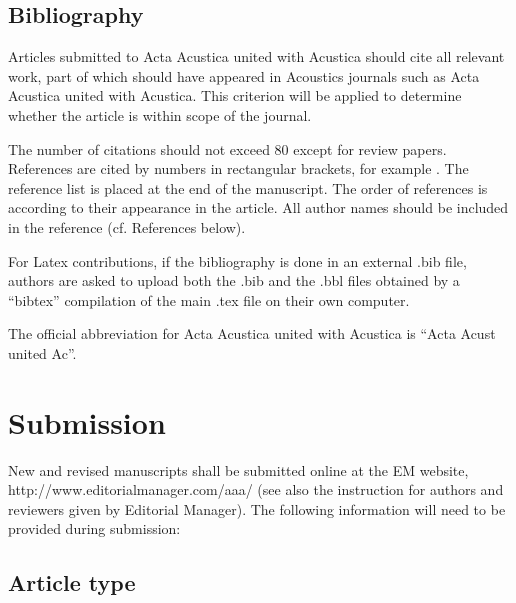 \documentclass[twocolumn]{article}
\begin{document}
\subsection{Bibliography}

Articles submitted to Acta Acustica united with Acustica should cite
all relevant work, part of which should have appeared in Acoustics
journals such as Acta Acustica united with Acustica. This criterion
will be applied to determine whether the article is within scope of
the journal.

The number of citations should not exceed 80 except for review papers.
References are cited by numbers in rectangular brackets, for example
\cite{3,4}. The reference list is placed at the end of the manuscript.
The order of references is according to their appearance in the article.
All author names should be included in the reference (cf. References
below).

For Latex contributions, if the bibliography is done in an external
.bib file, authors are asked to upload both the .bib and the .bbl
files obtained by a ``bibtex'' compilation of the main .tex file
on their own computer.

The official abbreviation for Acta Acustica united with
Acustica is ``Acta Acust united Ac''.


\section{Submission}

New and revised manuscripts shall be submitted online at the EM website,
http://www.editorialmanager.com/aaa/ (see also the instruction for
authors and reviewers given by Editorial Manager). The following
information will need to be provided during submission:

\subsection{Article type}
\end{document}

